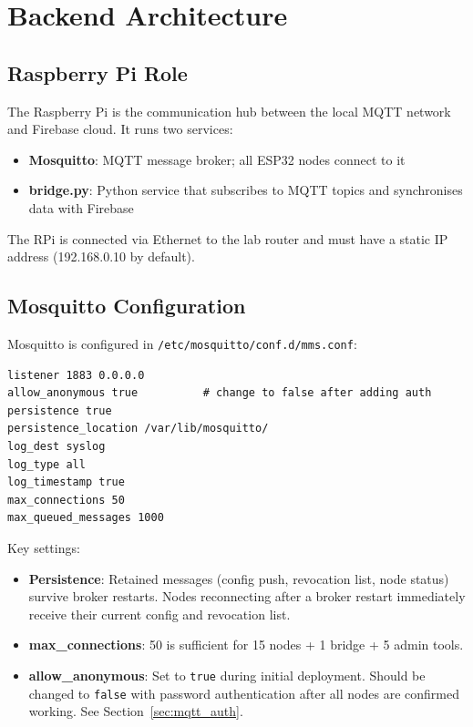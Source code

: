 \chapter{Backend Architecture}
\label{ch:backend}

\section{Raspberry Pi Role}

The Raspberry Pi is the communication hub between the local MQTT network and Firebase cloud. It runs two services:
\begin{itemize}[leftmargin=1.5em]
    \item \textbf{Mosquitto}: MQTT message broker; all ESP32 nodes connect to it
    \item \textbf{bridge.py}: Python service that subscribes to MQTT topics and synchronises data with Firebase
\end{itemize}

The RPi is connected via Ethernet to the lab router and must have a static IP address (192.168.0.10 by default).

\section{Mosquitto Configuration}

Mosquitto is configured in \texttt{/etc/mosquitto/conf.d/mms.conf}:

\begin{lstlisting}[caption={Mosquitto configuration file}]
listener 1883 0.0.0.0
allow_anonymous true          # change to false after adding auth
persistence true
persistence_location /var/lib/mosquitto/
log_dest syslog
log_type all
log_timestamp true
max_connections 50
max_queued_messages 1000
\end{lstlisting}

Key settings:
\begin{itemize}[leftmargin=1.5em]
    \item \textbf{Persistence}: Retained messages (config push, revocation list, node status) survive broker restarts. Nodes reconnecting after a broker restart immediately receive their current config and revocation list.
    \item \textbf{max\_connections}: 50 is sufficient for 15 nodes + 1 bridge + 5 admin tools.
    \item \textbf{allow\_anonymous}: Set to \texttt{true} during initial deployment. Should be changed to \texttt{false} with password authentication after all nodes are confirmed working. See Section~\ref{sec:mqtt_auth}.
\end{itemize}

